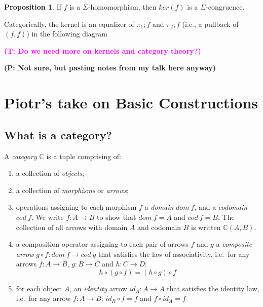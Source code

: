 \documentclass{amsart}
\theoremstyle{definition}
\newtheorem{proposition}[thm]{Proposition}
\newcommand{\truls}[1]{\textbf{\textcolor{magenta}{(T: #1)}}}
\newcommand{\piotr}[1]{\textbf{\textcolor{OliveGreen}{(P: #1)}}}
\newcommand{\acat}[1]{\mathbb{#1}} %
\renewcommand{\emph}{\textit} %
\begin{document}
\begin{proposition} If $f$ is a $\Sigma$-homomorphism, then $ker(f)$ is a
  $\Sigma$-congruence.
\end{proposition}

Categorically, the kernel is an equalizer of $\pi_1;f$ and $\pi_2;f$ (i.e., a pullback
of $(f,f)$) in the following diagram
\begin{center}
\end{center}

\truls{Do we need more on kernels and category theory?}

\piotr{Not sure, but pasting notes from my talk here anyway}

\section{Piotr's take on Basic Constructions}

\subsection{What is a category?}

A \emph{category} $\acat{C}$ is a tuple comprising of:

\begin{enumerate}
\item a collection of \emph{objects};
\item a collection of \emph{morphisms} or \emph{arrows};
\item  operations assigning to each morphism $f$ a \emph{domain} $dom\ f$,
  and a \emph{codomain} $cod\ f$. We write $f: A \to B$ to show that
  $dom\ f = A$ and $cod\ f = B$. The collection of all arrows with
  domain $A$ and codomain $B$ is written $\acat{C}(A,B)$.
\item a composition operator assigning to each pair of arrows $f$ and $g$ a
  \emph{composite arrow} $g\circ f: dom\ f\to cod\ g$ that satisfies the
  law of associativity, i.e.~for any arrows $f: A \to B$, $g: B\to C$
  and $h: C \to D$: \[
  h\circ (g \circ f) = (h \circ g) \circ f
  \]
\item for each object $A$, an \emph{identity} arrow $id_A: A \to A$ that
  satisfies the identity law, i.e.~for any arrow $f: A\to B$:
  $id_B \circ f = f$ and $f\circ id_A = f$
\end{enumerate}
\end{document}
